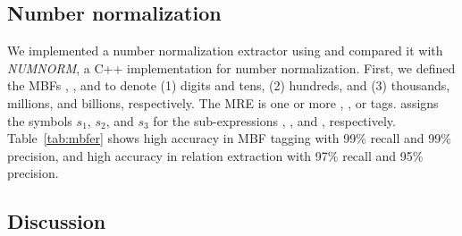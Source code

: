\vspace{-1em}
\subsection{Number normalization}
\label{subsec:numnorm}

We implemented a number normalization extractor using \framework and 
compared it with {\em NUMNORM}, a 
C++ implementation for number normalization. 
First, we defined the MBFs , , and 
to denote (1) digits and tens, (2) hundreds, and (3) 
thousands, millions, and billions, respectively.
The  MRE 
 is one or more , , or  tags. 
\framework assigns the symbols $s_1$, $s_2$, and $s_3$ 
for the sub-expressions , , and , respectively. 
%
Table~\ref{tab:mbfer} shows high accuracy in MBF tagging with 99\% recall and 99\% precision, and
high accuracy in relation extraction with 97\% recall and 95\% precision.

\vspace{-1em}
\subsection{Discussion}
\label{subsec:discuss}
\label{sec:discuss}

